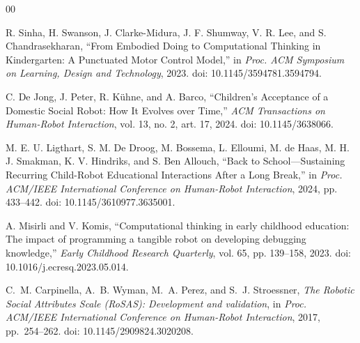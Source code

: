 \documentclass[conference,12pt,letterpaper]{IEEEtran}
\begin{document}
\begin{thebibliography}{00}

R. Sinha, H. Swanson, J. Clarke-Midura, J. F. Shumway, V. R. Lee, and S. Chandrasekharan,
``From Embodied Doing to Computational Thinking in Kindergarten: A Punctuated Motor Control Model,''
in \textit{Proc. ACM Symposium on Learning, Design and Technology},
2023.
doi: 10.1145/3594781.3594794.

C. De Jong, J. Peter, R. K\"uhne, and A. Barco,
``Children's Acceptance of a Domestic Social Robot: How It Evolves over Time,''
\textit{ACM Transactions on Human-Robot Interaction},
vol. 13, no. 2, art. 17, 2024.
doi: 10.1145/3638066.

M. E. U. Ligthart, S. M. De Droog, M. Bossema, L. Elloumi,
M. de Haas, M. H. J. Smakman, K. V. Hindriks, and S. Ben Allouch,
``Back to School---Sustaining Recurring Child-Robot Educational Interactions After a Long Break,''
in \textit{Proc. ACM/IEEE International Conference on Human-Robot Interaction},
2024, pp. 433--442.
doi: 10.1145/3610977.3635001.

A. Misirli and V. Komis,
``Computational thinking in early childhood education: The impact of programming a tangible robot on developing debugging knowledge,''
\textit{Early Childhood Research Quarterly},
vol. 65, pp. 139--158, 2023.
doi: 10.1016/j.ecresq.2023.05.014.

C.~M. Carpinella, A.~B. Wyman, M.~A. Perez, and S.~J. Stroessner,
\emph{The Robotic Social Attributes Scale (RoSAS): Development and validation},
in \textit{Proc. ACM/IEEE International Conference on Human-Robot Interaction},
2017, pp.~254--262. doi: 10.1145/2909824.3020208.

\end{thebibliography}
\end{document}
